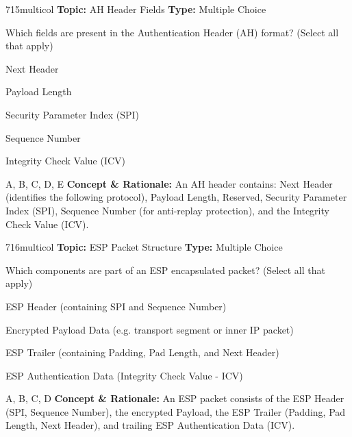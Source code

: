 \begin{qcard}{715}{multicol}
\textcolor{darkslate!75}{\small\textbf{Topic:} AH Header Fields \hfill \textbf{Type:} Multiple Choice}\vspace{0.4em}\par
Which fields are present in the Authentication Header (AH) format? (Select all that apply)
\begin{qoptions}
\item Next Header
\item Payload Length
\item Security Parameter Index (SPI)
\item Sequence Number
\item Integrity Check Value (ICV)
\end{qoptions}
\end{qcard}
\nopagebreak
\begin{explainbox}{A, B, C, D, E}
\textbf{Concept \& Rationale:} An AH header contains: Next Header (identifies the following protocol), Payload Length, Reserved, Security Parameter Index (SPI), Sequence Number (for anti-replay protection), and the Integrity Check Value (ICV).
\end{explainbox}

\begin{qcard}{716}{multicol}
\textcolor{darkslate!75}{\small\textbf{Topic:} ESP Packet Structure \hfill \textbf{Type:} Multiple Choice}\vspace{0.4em}\par
Which components are part of an ESP encapsulated packet? (Select all that apply)
\begin{qoptions}
\item ESP Header (containing SPI and Sequence Number)
\item Encrypted Payload Data (e.g. transport segment or inner IP packet)
\item ESP Trailer (containing Padding, Pad Length, and Next Header)
\item ESP Authentication Data (Integrity Check Value - ICV)
\end{qoptions}
\end{qcard}
\nopagebreak
\begin{explainbox}{A, B, C, D}
\textbf{Concept \& Rationale:} An ESP packet consists of the ESP Header (SPI, Sequence Number), the encrypted Payload, the ESP Trailer (Padding, Pad Length, Next Header), and trailing ESP Authentication Data (ICV).
\end{explainbox}

